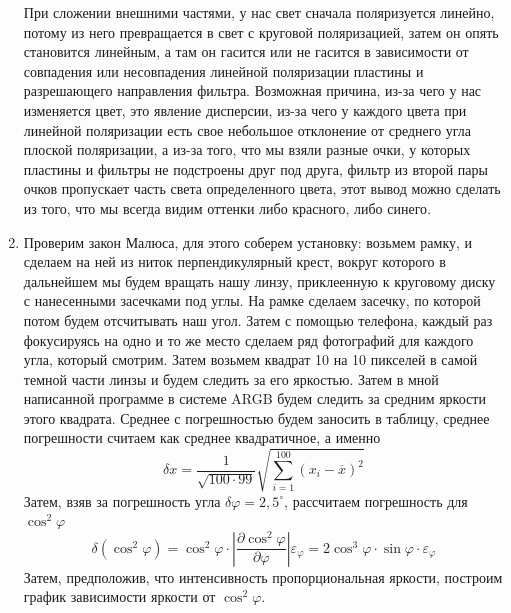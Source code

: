 \documentclass[a4paper, 12pt]{article}%
\begin{document}
\begin{enumerate}
При сложении внешними частями, у нас свет сначала поляризуется линейно, потому из него превращается в свет с круговой поляризацией, затем он опять становится линейным, а там он гасится или не гасится в зависимости от совпадения или несовпадения линейной поляризации пластины и разрешающего направления фильтра. Возможная причина, из-за чего у нас изменяется цвет, это явление дисперсии, из-за чего у каждого цвета при линейной поляризации есть свое небольшое отклонение от среднего угла плоской поляризации, а из-за того, что мы взяли разные очки, у которых пластины и фильтры не подстроены друг под друга, фильтр из второй пары очков пропускает часть света определенного цвета, этот вывод можно сделать из того, что мы всегда видим оттенки либо красного, либо синего.
\item Проверим закон Малюса, для этого соберем установку: возьмем рамку, и сделаем на ней из ниток перпендикулярный крест, вокруг которого в дальнейшем мы будем вращать нашу линзу, приклеенную к круговому диску с нанесенными засечками под углы. На рамке сделаем засечку, по которой потом будем отсчитывать наш угол. Затем с помощью телефона, каждый раз фокусируясь на одно и то же место сделаем ряд фотографий для каждого угла, который смотрим. Затем возьмем квадрат 10 на 10 пикселей в самой темной части линзы и будем следить за его яркостью. Затем в мной написанной программе в системе ARGB будем следить за средним яркости этого квадрата. Среднее с погрешностью будем заносить в таблицу, среднее погрешности считаем как среднее квадратичное, а именно 
\[\delta x = \frac{1}{\sqrt{100\cdot99}}\sqrt{\sum\limits_{i = 1}^{100} \left(x_i - \overline{x}\right)^2}\]
Затем, взяв за погрешность угла $\delta \varphi = 2,5^{\circ}$, рассчитаем погрешность для $\cos^2\varphi$
\[\delta\left( \cos^2\varphi\right) = \cos^2\varphi \cdot \left| \dfrac{\partial \cos^2 \varphi}{\partial\varphi}\right| \varepsilon_{\varphi} = 2 \cos^3\varphi \cdot \sin\varphi \cdot \varepsilon_{\varphi}\]
Затем, предположив, что интенсивность пропорциональная яркости, построим график зависимости яркости от $\cos^2\varphi$.


\end{enumerate}
\end{document}
